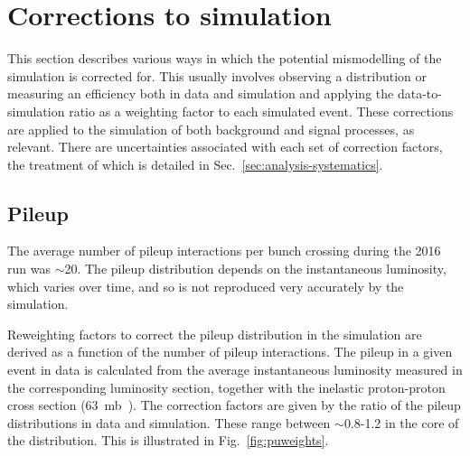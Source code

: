\section{Corrections to simulation}
\label{sec:analysis-mccorrections}
This section describes various ways in which the potential mismodelling of the 
simulation is corrected for. This usually involves observing a distribution or 
measuring an efficiency both in data and simulation and applying the 
data-to-simulation ratio as a weighting factor to each simulated event. These 
corrections are applied to the simulation of both background and signal 
processes, as relevant.
There are uncertainties associated with each set of correction factors, the 
treatment of which is detailed in Sec.~\ref{sec:analysis-systematics}.


\subsection{Pileup}
\label{sec:analysis-mccorrections-pileup}

The average number of pileup interactions per bunch crossing during the 2016 
run was $\sim$20. The pileup distribution depends on the instantaneous 
luminosity, which varies over time, and so is not reproduced very accurately by 
the simulation.

Reweighting factors to correct the pileup distribution in the simulation are 
derived as a function of the number of pileup interactions. The pileup in a 
given event in data is calculated from the average instantaneous luminosity 
measured in the corresponding luminosity section, together with the inelastic 
proton-proton cross section (63~mb~\cite{inelasticxs-atlas13tev}). The 
correction factors are given by the ratio of the pileup distributions in data 
and simulation. These range between $\sim$0.8-1.2 in the core of the 
distribution. This is illustrated in Fig.~\ref{fig:puweights}. 

